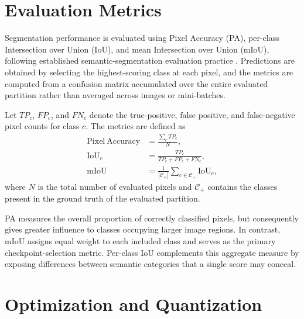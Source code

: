 \section{Evaluation Metrics}
\label{sec:segmentation-evaluation-metrics}

Segmentation performance is evaluated using Pixel Accuracy (PA), per-class Intersection over Union (IoU), and mean Intersection over Union (mIoU), following established semantic-segmentation evaluation practice \cite{long2015fcn}. Predictions are obtained by selecting the highest-scoring class at each pixel, and the metrics are computed from a confusion matrix accumulated over the entire evaluated partition rather than averaged across images or mini-batches.

Let \(TP_c\), \(FP_c\), and \(FN_c\) denote the true-positive, false positive, and false-negative pixel counts for class \(c\). The metrics are defined as
\begin{equation}
    \begin{aligned}
        \mathrm{Pixel\ Accuracy}
         & = \frac{\sum_c TP_c}{N},           \\
        \mathrm{IoU}_c
         & = \frac{TP_c}{TP_c + FP_c + FN_c}, \\
        \mathrm{mIoU}
         & = \frac{1}{|\mathcal{C}_{+}|}
        \sum_{c \in \mathcal{C}_{+}} \mathrm{IoU}_c,
    \end{aligned}
    \label{eq:segmentation-evaluation-metrics}
\end{equation}
where \(N\) is the total number of evaluated pixels and \(\mathcal{C}_{+}\) contains the classes present in the ground truth of the evaluated partition.

PA measures the overall proportion of correctly classified pixels, but consequently gives greater influence to classes occupying larger image regions. In contrast, mIoU assigns equal weight to each included class and serves as the primary checkpoint-selection metric. Per-class IoU complements this aggregate measure by exposing differences between semantic categories that a single score may conceal.


\section{Optimization and Quantization}
\label{sec:optimization-quantization}

